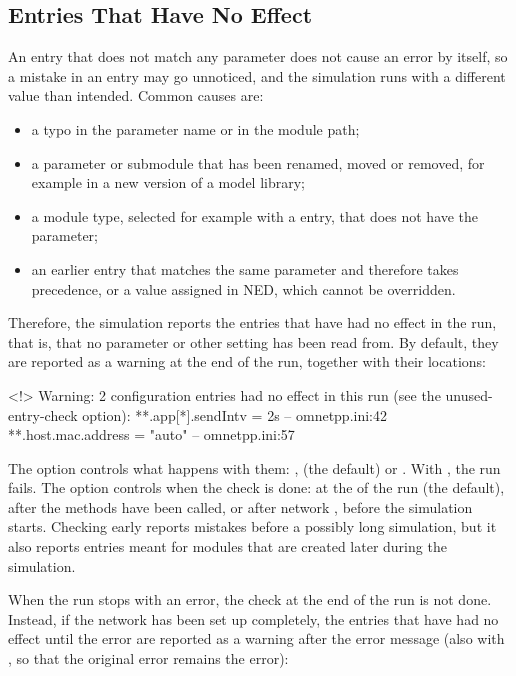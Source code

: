 \subsection{Entries That Have No Effect}
\label{sec:config-sim:unused-entries}

An entry that does not match any parameter does not cause an error by
itself, so a mistake in an entry may go unnoticed, and the simulation runs
with a different value than intended. Common causes are:

\begin{itemize}
  \item a typo in the parameter name or in the module path;
  \item a parameter or submodule that has been renamed, moved or removed,
    for example in a new version of a model library;
  \item a module type, selected for example with a  entry,
    that does not have the parameter;
  \item an earlier entry that matches the same parameter and therefore takes
    precedence, or a value assigned in NED, which cannot be overridden.
\end{itemize}

Therefore, the simulation reports the entries that have had no effect in
the run, that is, that no parameter or other setting has been read from.
By default, they are reported as a warning at the end of the run, together
with their locations:

\begin{filelisting}
<!> Warning: 2 configuration entries had no effect in this run (see the
unused-entry-check option):
  **.app[*].sendIntv = 2s  -- omnetpp.ini:42
  **.host.mac.address = "auto"  -- omnetpp.ini:57
\end{filelisting}

The  option controls what happens with them:
,  (the default) or . With ,
the run fails. The  option controls when
the check is done: at the  of the run (the default), after the
 methods have been called, or after network
, before the simulation starts. Checking early reports
mistakes before a possibly long simulation, but it also reports entries
meant for modules that are created later during the simulation.

When the run stops with an error, the check at the end of the run is not
done. Instead, if the network has been set up completely, the entries that
have had no effect until the error are reported as a warning after the error
message (also with , so that the original error remains the
error):

